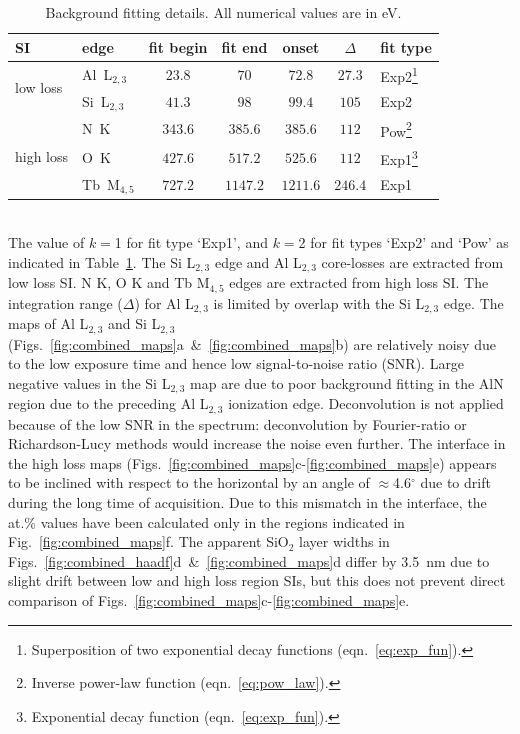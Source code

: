 \documentclass[%
aip,
rsi,%
 amsmath,amssymb,%
 reprint,%
]{revtex4-1}
\begin{document}
\begin{table}%
	\caption{Background fitting details. All numerical values are in eV.}
    \label{tab:back_fit_table}
    \begin{ruledtabular}
    	\begin{tabular}{llccccl}
    		SI	&edge &fit begin&fit end&onset&$\Delta$&fit type 	\\ \hline
            \multirow{2}{*}{low loss}&Al~L$_{2,3}$& $23.8$&$70$&$72.8$&$27.3$&Exp2\footnote{Superposition of two exponential decay functions (eqn.~\ref{eq:exp_fun}).} 		\\
            		&Si~L$_{2,3}$&$41.3$&$98$&$99.4$&$105$&Exp2 			\\ \hline
            \multirow{3}{*}{high loss}&N~K&$343.6$&$385.6$&$385.6$&$112$&Pow\footnote{Inverse power-law function (eqn.~\ref{eq:pow_law}).} 			\\
                	&O~K&$427.6$&$517.2$&$525.6$&$112$&Exp1\footnote{Exponential decay function (eqn.~\ref{eq:exp_fun}).} 			\\
            		&Tb~M$_{4,5}$&$727.2$&$1147.2$&$1211.6$&$246.4$&Exp1 	\\
    	\end{tabular}
    \end{ruledtabular}
\end{table}\\
The value of $k = $1 for fit type \lq{Exp1}\rq{}, and $k = $2 for fit types \lq{Exp2}\rq{} and \lq{Pow}\rq{} as indicated in Table~\ref{tab:back_fit_table}. The Si L$_{2,3}$ edge and Al L$_{2,3}$ core-losses are extracted from low loss SI. N K, O K and Tb M$_{4,5}$ edges are extracted from high loss SI. The integration range ($\Delta$) for Al L$_{2,3}$ is limited by overlap with the Si L$_{2,3}$ edge. The maps of Al L$_{2,3}$ and Si L$_{2,3}$ (Figs.~\ref{fig:combined_maps}a~\&~\ref{fig:combined_maps}b) are relatively noisy due to the low exposure time and hence low signal-to-noise ratio (SNR). Large negative values in the Si L$_{2,3}$ map are due to poor background fitting in the AlN region due to the preceding Al L$_{2,3}$ ionization edge. Deconvolution is not applied because of the low SNR in the spectrum: deconvolution by Fourier-ratio or Richardson-Lucy methods would increase the noise even further. The interface in the high loss maps (Figs.~\ref{fig:combined_maps}c-\ref{fig:combined_maps}e) appears to be inclined with respect to the horizontal by an angle of $\approx$4.6$^\circ$ due to drift during the long time of acquisition. Due to this mismatch in the interface, the at.\% values have been calculated only in the regions indicated in Fig.~\ref{fig:combined_maps}f. The apparent SiO$_2$ layer widths in Figs.~\ref{fig:combined_haadf}d~\&~\ref{fig:combined_maps}d differ by 3.5~nm due to slight drift between low and high loss region SIs, but this does not prevent direct comparison of Figs.~\ref{fig:combined_maps}c-\ref{fig:combined_maps}e.
\end{document}
